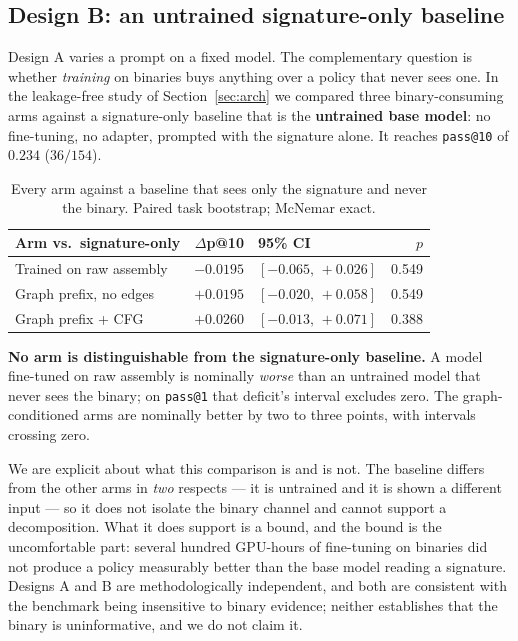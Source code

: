 \documentclass[conference]{IEEEtran}
\makeatletter
\newcommand{\passat}[1]{\texttt{pass@#1}\xspace}
\makeatother
\begin{document}
\subsection{Design B: an untrained signature-only baseline}
Design A varies a prompt on a fixed model. The complementary question is whether
\emph{training} on binaries buys anything over a policy that never sees one. In
the leakage-free study of Section~\ref{sec:arch} we compared three
binary-consuming arms against a signature-only baseline that is the
\textbf{untrained base model}: no fine-tuning, no adapter, prompted with the
signature alone. It reaches \passat{10} of $0.234$ ($36/154$).

\begin{table}[t]
\caption{Every arm against a baseline that sees only the signature and never the
binary. Paired task bootstrap; McNemar exact.}
\label{tab:sigonly}
\centering\footnotesize
\begin{tabular}{@{}lrlr@{}}
\toprule
\textbf{Arm vs.\ signature-only} & \textbf{$\Delta$p@10} & \textbf{95\% CI} & \textbf{$p$}\\
\midrule
Trained on raw assembly & $-0.0195$ & $[-0.065,\,+0.026]$ & 0.549\\
Graph prefix, no edges  & $+0.0195$ & $[-0.020,\,+0.058]$ & 0.549\\
Graph prefix + CFG      & $+0.0260$ & $[-0.013,\,+0.071]$ & 0.388\\
\bottomrule
\end{tabular}
\end{table}

\textbf{No arm is distinguishable from the signature-only baseline.} A model
fine-tuned on raw assembly is nominally \emph{worse} than an untrained model that
never sees the binary; on \passat{1} that deficit's interval excludes zero. The
graph-conditioned arms are nominally better by two to three points, with
intervals crossing zero.

We are explicit about what this comparison is and is not. The baseline differs
from the other arms in \emph{two} respects --- it is untrained and it is shown a
different input --- so it does not isolate the binary channel and cannot support
a decomposition. What it does support is a bound, and the bound is the
uncomfortable part: several hundred GPU-hours of fine-tuning on binaries did not
produce a policy measurably better than the base model reading a signature.
Designs A and B are methodologically independent, and both are consistent with
the benchmark being insensitive to binary evidence; neither establishes that the
binary is uninformative, and we do not claim it.
\end{document}
